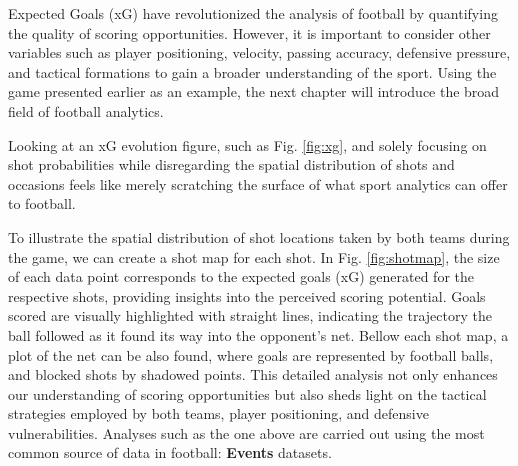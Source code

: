 \documentclass[
  10pt,
  twoside,nohyper]{book}
\begin{document}
Expected Goals (xG) have revolutionized the analysis of football by quantifying the quality of scoring opportunities. However, it is important to consider other variables such as player positioning, velocity, passing accuracy, defensive pressure, and tactical formations to gain a broader understanding of the sport. Using the game presented earlier as an example, the next chapter will introduce the broad field of football analytics.

Looking at an xG evolution figure, such as Fig. \ref{fig:xg}, and solely focusing on shot probabilities while disregarding the spatial distribution of shots and occasions feels like merely scratching the surface of what sport analytics can offer to football.

To illustrate the spatial distribution of shot locations taken by both teams during the game, we can create a shot map for each shot. In Fig. \ref{fig:shotmap}, the size of each data point corresponds to the expected goals (xG) generated for the respective shots, providing insights into the perceived scoring potential. Goals scored are visually highlighted with straight lines, indicating the trajectory the ball followed as it found its way into the opponent's net. Bellow each shot map, a plot of the net can be also found, where goals are represented by football balls, and blocked shots by shadowed points. This detailed analysis not only enhances our understanding of scoring opportunities but also sheds light on the tactical strategies employed by both teams, player positioning, and defensive vulnerabilities. Analyses such as the one above are carried out using the most common
source of data in football: \textbf{Events} datasets.
\end{document}
